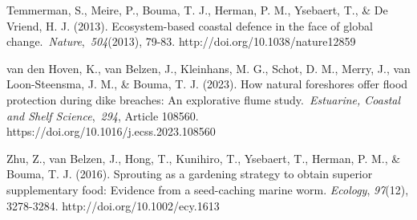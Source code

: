\documentclass[authordate, empirical]{jote-new-article}
\begin{document}
	Temmerman, S., Meire, P., Bouma, T. J., Herman, P. M., Ysebaert, T., \& De Vriend, H. J. (2013). Ecosystem-based coastal defence in the face of global change. \emph{Nature}, \emph{504}(2013), 79-83. http://doi.org/10.1038/nature12859



	van den Hoven, K., van Belzen, J., Kleinhans, M. G., Schot, D. M., Merry, J., van Loon-Steensma, J. M., \& Bouma, T. J. (2023). How natural foreshores offer flood protection during dike breaches: An explorative flume study. \emph{Estuarine, Coastal and Shelf Science}, \emph{294}, Article 108560. https://doi.org/10.1016/j.ecss.2023.108560



	Zhu, Z., van Belzen, J., Hong, T., Kunihiro, T., Ysebaert, T., Herman, P. M., \& Bouma, T. J. (2016). Sprouting as a gardening strategy to obtain superior supplementary food: Evidence from a seed-caching marine worm. \emph{Ecology}, \emph{97}(12), 3278-3284. http://doi.org/10.1002/ecy.1613
\end{document}
